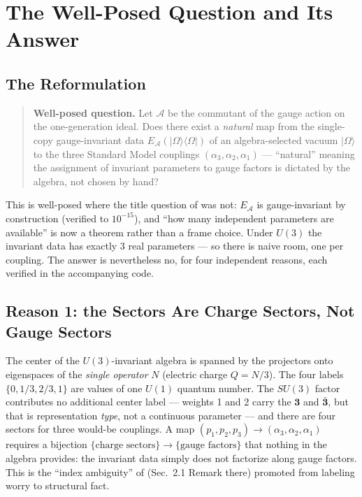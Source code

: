 \documentclass[11pt]{article}
\newcommand{\Alg}{\mathcal{A}}
\newcommand{\EA}{E_{\mathcal{A}}}
\begin{document}
\section{The Well-Posed Question and Its Answer}

\subsection{The Reformulation}

\begin{quote}
\textbf{Well-posed question.} Let $\Alg$ be the commutant of the gauge action on the one-generation ideal. Does there exist a \emph{natural} map from the single-copy gauge-invariant data $\EA(|\Omega\rangle\langle\Omega|)$ of an algebra-selected vacuum $|\Omega\rangle$ to the three Standard Model couplings $(\alpha_3, \alpha_2, \alpha_1)$ --- ``natural'' meaning the assignment of invariant parameters to gauge factors is dictated by the algebra, not chosen by hand?
\end{quote}

This is well-posed where the title question of \cite{companion} was not: $\EA$ is gauge-invariant by construction (verified to $10^{-15}$), and ``how many independent parameters are available'' is now a theorem rather than a frame choice. Under $U(3)$ the invariant data has exactly 3 real parameters --- so there is naive room, one per coupling. The answer is nevertheless no, for four independent reasons, each verified in the accompanying code.

\subsection{Reason 1: the Sectors Are Charge Sectors, Not Gauge Sectors}

The center of the $U(3)$-invariant algebra is spanned by the projectors onto eigenspaces of the \emph{single operator} $N$ (electric charge $Q = N/3$). The four labels $\{0, 1/3, 2/3, 1\}$ are values of one $U(1)$ quantum number. The $SU(3)$ factor contributes no additional center label --- weights 1 and 2 carry the $\mathbf{3}$ and $\bar{\mathbf{3}}$, but that is representation \emph{type}, not a continuous parameter --- and there are four sectors for three would-be couplings. A map $(p_1, p_2, p_3) \to (\alpha_3, \alpha_2, \alpha_1)$ requires a bijection $\{\text{charge sectors}\} \to \{\text{gauge factors}\}$ that nothing in the algebra provides: the invariant data simply does not factorize along gauge factors. This is the ``index ambiguity'' of \cite{companion} (Sec.~2.1 Remark there) promoted from labeling worry to structural fact.
\end{document}

